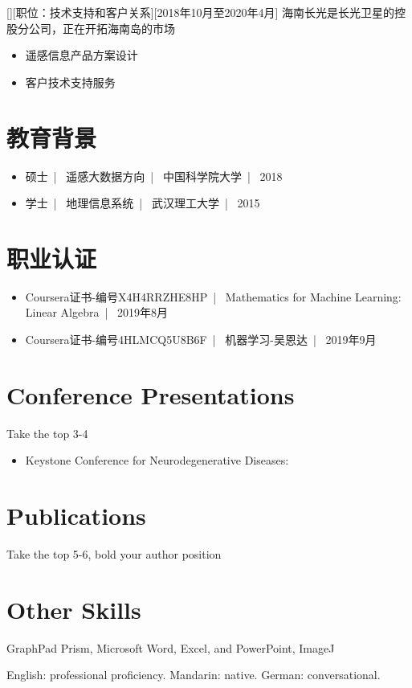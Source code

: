 \documentclass{{ctexart}}
\begin{document}
[][职位：技术支持和客户关系][2018年10月至2020年4月]
海南长光是长光卫星的控股分公司，正在开拓海南岛的市场
\begin{itemize}
\item 遥感信息产品方案设计
\item 客户技术支持服务
\end{itemize}

 
\section{教育背景}

\begin{itemize}
\item 硕士\ | \ 遥感大数据方向\ | \ 中国科学院大学\ | \ 2018
\item 学士\ | \ 地理信息系统\ | \ 武汉理工大学\ | \ 2015
\end{itemize}

\section{职业认证}
\begin{itemize}
\item Coursera证书-编号X4H4RRZHE8HP\ | \ Mathematics for Machine Learning: Linear Algebra\ | \ 2019年8月
\item Coursera证书-编号4HLMCQ5U8B6F\ | \ 机器学习-吴恩达\ | \ 2019年9月 
\end{itemize}

\section{Conference Presentations }

Take the top 3-4
\begin{itemize}
\item Keystone Conference for Neurodegenerative Diseases:
\end{itemize}

 
\section{Publications}
Take the top 5-6, bold your author position 


\section{Other Skills}
\begin{description}[widest=Langauges]
\item[Software]	GraphPad Prism, Microsoft Word, Excel, and PowerPoint, ImageJ
\item[Languages]	English: professional proficiency.  Mandarin: native.  German: conversational.
\end{description}
\end{document}
